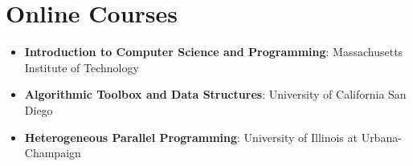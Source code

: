 \documentclass[letterpaper,11pt]{article}
\newcommand{\resumeSubHeadingListStart}{\begin{itemize}[leftmargin=*]}
\newcommand{\resumeSubHeadingListEnd}{\end{itemize}}
\begin{document}
\section{Online Courses}
 \resumeSubHeadingListStart
    \item{
     \textbf{Introduction to Computer Science and
     Programming}{: Massachusetts Institute of Technology}
    }
    \item{
     \textbf{Algorithmic Toolbox and Data Structures}{: University of California San Diego}
    }
    \item{
     \textbf{Heterogeneous Parallel Programming}{: University of Illinois at Urbana-Champaign}
    }
    
 \resumeSubHeadingListEnd 
 
\end{document}
